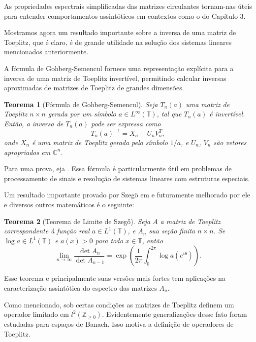 \documentclass[a4paper,12pt]{article}
\newtheorem*{theorem*}{Teorema}
\theoremstyle{definition}
\begin{document}
As propriedades espectrais simplificadas das matrizes circulantes tornam-nas úteis para entender comportamentos assintóticos em contextos como o do Capítulo 3.

Mostramos agora um resultado importante sobre a inversa de uma matriz de Toeplitz, que é claro, é de grande utilidade na solução dos sistemas lineares mencionados anteriormente.

A fórmula de Gohberg-Semencul fornece uma representação explícita para a inversa de uma matriz de Toeplitz invertível, permitindo calcular inversas aproximadas de matrizes de Toeplitz de grandes dimensões.
\begin{theorem*}[Fórmula de Gohberg-Semencul]
  Seja $ T_n(a)$ uma matriz de Toeplitz $ n \times n$ gerada por um símbolo $ a \in L^\infty(\mathbb{T})$, tal que $ T_n(a)$ é invertível. Então, a inversa de $ T_n(a)$ pode ser expressa como
  \[
    T_n(a)^{-1} = X_n - U_n V_n^T,
  \]
  onde $ X_n$ é uma matriz de Toeplitz gerada pelo símbolo $1 / a$, e $ U_n$, $ V_n$ são vetores apropriados em $ \mathbb{C}^n$.
\end{theorem*}
Para uma prova, eja \cite{gohberg1972}.
Essa fórmula é particularmente útil em problemas de processamento de sinais e resolução de sistemas lineares com estruturas especiais.

Um resultado importante provado por Szegö em \cite{szego1915} e futuramente melhorado por ele e diversos outros matemáticos é o seguinte:
\begin{theorem*}[Teorema de Limite de Szegő]
  Seja $A$ a matriz de Toeplitz correspondente à função real $a \in L^1(\mathbb{T})$, e $A_n$ sua seção finita $n \times n$. Se $\log a \in L^1(\mathbb{T})$ e $a(x) > 0$ para todo $x \in \mathbb{T}$, então \[\lim_{n\to \infty} \frac{\det A_n}{\det A_{n-1}} = \exp\left(\frac{1}{2\pi} \int_{0}^{2\pi} \log a\left(e^{i\theta}\right) \right)\text{.}\]
\end{theorem*}

Esse teorema e principalmente suas versões mais fortes tem aplicações na caracterização assintótica do espectro das matrizes $A_n$.

Como mencionado, sob certas condições as matrizes de Toeplitz definem um operador limitado em $l^2(\mathbb{Z}_{\ge 0})$. Evidentemente generalizações desse fato foram estudadas para espaços de Banach. Isso motiva a definição de operadores de Toeplitz.
\end{document}
